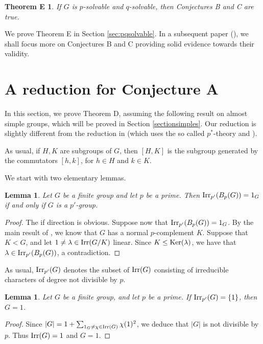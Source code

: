 \documentclass[12pt,leqno,a4paper]{amsart}
\def\irr#1{{\rm Irr}(#1)}
\def\irrp#1#2{{\rm Irr}_{#1'}(#2)}
\newtheorem{lem}[thm]{Lemma}
\newtheorem*{thmE}{Theorem E}
\theoremstyle{remark}
\begin{document}
 \begin{thmE}
If $G$ is $p$-solvable and $q$-solvable, then Conjectures B and C are true.
\end{thmE}



\medskip 


{We prove Theorem E in Section \ref{sec:pqsolvable}.} In 
a subsequent paper (\cite{NRS2}),  we shall  focus more on Conjectures B and C providing solid evidence towards their validity.
 

\section{A reduction for Conjecture A}\label{sectionreduction}
In this section, we prove Theorem D, assuming the following
result on almost simple groups, which will be proved in Section \ref{sectionsimples}.
Our reduction is slightly different from the reduction in \cite{LWXZ}
(which uses the so called $p^*$-theory and \cite{W86} ).

As usual, if $H,K$ are subgroups of $G$, then $[H,K]$ is the subgroup generated by the commutators
$[h,k]$, for $h \in H$ and $k \in K$. 

\medskip


We start with two elementary lemmas.

\begin{lem}\label{th}
Let $G$ be a finite group
and let $p$ be a prime. Then $\irrp{p}{B_p(G)}=1_G$
if and only if $G$ is a $p'$-group.
\end{lem}

\begin{proof}
The if direction is obvious. Suppose now that $\irrp{p}{B_p(G)}=1_G$. By the main result of \cite{IS}, we know that
$G$ has a normal $p$-complement $K$.
Suppose that $K<G$, and let $1 \ne \lambda \in \irr{G/K}$ linear. Since $K\leq {\rm Ker}(\lambda)$, we have that $\lambda\in{\rm Irr}_{p'}(B_p(G))$, a contradiction.
\end{proof}

As usual, $\irrp{p}G$ denotes the subset of $\irr G$ consisting of irreducible characters of degree not divisible by $p$.
 
 \begin{lem}\label{tr}
 Let $G$ be a finite group,
and let $p$ be a prime. If $\irrp{p}G=\{1\}$, then $G=1$.
 \end{lem}
 \begin{proof}
 Since $|G|=1 + \sum_{1_G \ne \chi \in \irr G} \chi(1)^2$,
 we deduce that $|G|$ is not divisible by $p$.
 Thus $\irr G=1$ and $G=1$.
  \end{proof}
\end{document}

